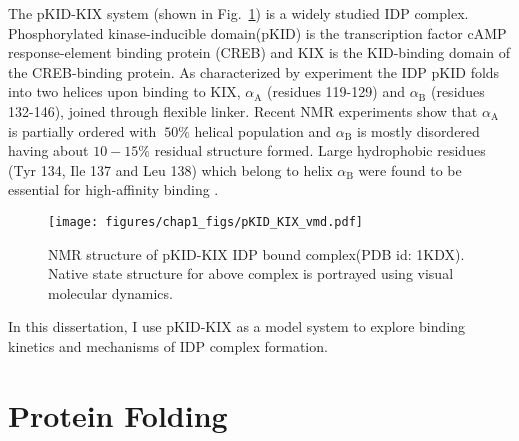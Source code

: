 \documentclass[../talant.diss.submit.tex]{subfiles}
\begin{document}
The pKID-KIX system (shown in Fig.~\ref{fig:pKID_KIX_vmd}) is a widely studied
IDP complex.  Phosphorylated kinase-inducible domain(pKID) is the transcription
factor cAMP response-element binding protein (CREB) and KIX is the KID-binding
domain of the CREB-binding protein. As characterized by experiment the IDP pKID
folds into two helices upon binding to KIX, $\alpha_{\mathrm{A}}$ (residues
119-129) and $\alpha_{\mathrm{B}}$ (residues 132-146), joined through flexible
linker\cite{zor:02}. Recent NMR experiments show that $\alpha_{\mathrm{A}}$ is
partially ordered with $~50\% $ helical population and $\alpha_{\mathrm{B}}$ is
mostly disordered having about $10-15\%$ residual structure
formed\cite{radhakrishnan:98}.  Large hydrophobic residues (Tyr 134, Ile 137 and
Leu 138) which belong to helix $\alpha_{\mathrm{B}}$ were found to be essential for
high-affinity binding \cite{radhakrishnan:97,parker:98}.
%
%
\begin{figure}[htp!]
  \begin{centering}
    \texttt{[image: figures/chap1\_figs/pKID\_KIX\_vmd.pdf]}
    \caption{NMR structure of pKID-KIX IDP bound complex(PDB id: 1KDX).
      Native state structure for above complex is portrayed using
      visual molecular dynamics\cite{Humphrey:96}.}
    \label{fig:pKID_KIX_vmd}
  \end{centering}
\end{figure}
%
%
In this dissertation, I use pKID-KIX as a model system to explore binding kinetics and mechanisms
of IDP complex formation.

%
\section{\textbf{Protein Folding}}\label{sect:one_four}
\end{document}
